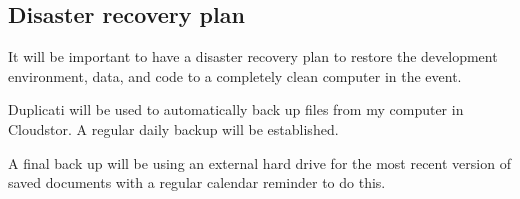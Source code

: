 \documentclass{article}
\begin{document}
\subsection*{Disaster recovery plan}

It will be important to have a disaster recovery plan to restore the development environment, data, and code to a completely clean computer in the event.

Duplicati will be used to automatically back up files from my computer in Cloudstor. A regular daily backup will be established.

A final back up will be using an external hard drive for the most recent version of saved documents with a regular calendar reminder to do this. 
\end{document}
